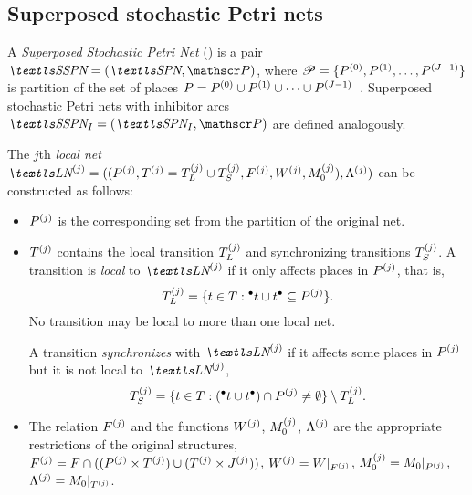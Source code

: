 \subsection{Superposed stochastic Petri nets}

\begin{dfn}
  \label{dfn:background:sspn}
  A \emph{Superposed Stochastic Petri Net} () is a pair
  $\SSPN = (\SPN, \partitions)$, where
  $\mathscr{P} = \{ P^{(0)}, P^{(1)}, \ldots, P^{(J - 1)} \}$
  is partition of the set of places
  $P = P^{(0)} \cup P^{(1)} \cup \cdots \cup P^{(J -
    1)}$~\citep{DBLP:conf/apn/Donatelli94}.
  Superposed stochastic Petri nets with inhibitor arcs
  $\SSPN_I = (\SPN_I, \partitions)$ are defined analogously.
\end{dfn}

The $j$th \emph{local net}
$\LN{j} = ((\loc{P}{j}, \loc{T}{j} = \loc{T_L}{j} \cup \loc{T_S}{j},
\loc{F}{j}, \loc{W}{j}, \loc{M_0}{j}), \loc{\Lambda}{j})$
can be constructed as follows:
\begin{itemize}
\item $P^{(j)}$ is the corresponding set from the partition of the
  original net.
\item $T^{(j)}$ contains the local transition $T_L^{(j)}$ and
  synchronizing transitions $T_S^{(j)}$. A transition is
  \emph{local} to $\LN{j}$ if it only affects places in $P^{(j)}$,
  that is,
  \begin{equation}
    \label{eq:background:sspn:localtran}
    T_L^{(j)} = \{ t \in T : \prescript{\bullet}{}{t} \cup t^\bullet \subseteq
    P^{(j)} \} \text.
  \end{equation}
  No transition may be local to more than one local net.

  A transition \emph{synchronizes} with $\LN{j}$ if it affects some
  places in $P^{(j)}$ but it is not local to $\LN{j}$,
  \begin{equation}
    \label{eq:background:sspn:synctran}
    T_S^{(j)} = \{ t \in T : (\prescript{\bullet}{}{t} \cup t^\bullet) \cap
    P^{(j)} \ne \emptyset \} \setminus T_L^{(j)} \text.
  \end{equation}
\item The relation $F^{(j)}$ and the functions $W^{(j)}$,
  $M_0^{(j)}$, $\Lambda^{(j)}$ are the appropriate restrictions
  of the original structures,
  $F^{(j)} = F \cap ((P^{(j)} \times T^{(j)}) \cup
  (T^{(j)} \times J^{(j)}))$, $W^{(j)} = W |_{F^{(j)}}$,
  $M_0^{(j)} = M_0 |_{P^{(j)}}$, $\Lambda^{(j)} = M_0 |_{T^{(j)}}$.
\end{itemize}

